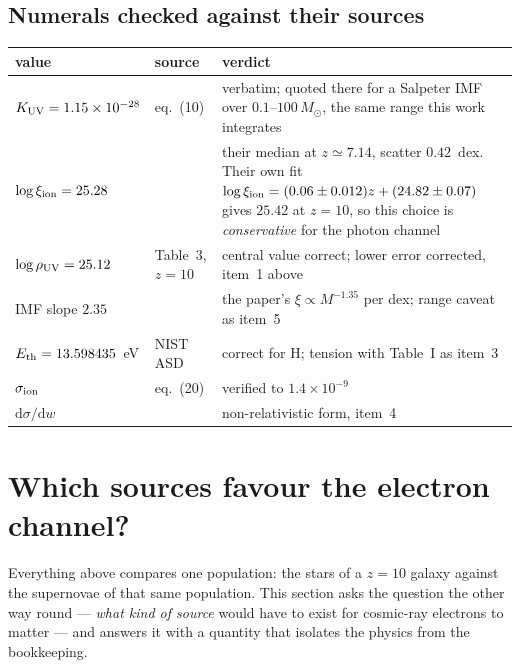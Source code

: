\documentclass[11pt,a4paper]{article}
\begin{document}
\subsection{Numerals checked against their sources}
\begin{center}\small
\begin{tabular}{llp{6.1cm}}
\hline
value & source & verdict \\
\hline
$K_{\rm UV}=1.15\times10^{-28}$ & \cite{md14} eq.~(10) & verbatim; quoted there for a
  Salpeter IMF over $0.1$--$100\,M_\odot$, the same range this work integrates \\
$\log\xi_{\rm ion}=25.28$ & \cite{llerena25} & their median at $z\simeq7.14$,
  scatter $0.42$~dex. Their own fit
  $\log\xi_{\rm ion}=(0.06\pm0.012)z+(24.82\pm0.07)$ gives $25.42$ at $z=10$, so
  this choice is \emph{conservative} for the photon channel \\
$\log\rho_{\rm UV}=25.12$ & \cite{donnan24} Table~3, $z=10$ & central value
  correct; lower error corrected, item~1 above \\
IMF slope $2.35$ & \cite{salpeter} & the paper's $\xi\propto M^{-1.35}$ per dex;
  range caveat as item~5 \\
$E_{\rm th}=13.598435$~eV & NIST ASD & correct for H; tension with
  \cite{kimrudd94} Table~I as item~3 \\
$\sigma_{\rm ion}$ & \cite{kim00} eq.~(20) & verified to $1.4\times10^{-9}$ \\
$\mathrm{d}\sigma/\mathrm{d}w$ & \cite{kimrudd94} & non-relativistic form, item~4 \\
\hline
\end{tabular}
\end{center}

\clearpage
\section{Which sources favour the electron channel?}\label{sec:sources}

Everything above compares one population: the stars of a $z=10$ galaxy against the
supernovae of that same population. This section asks the question the other way
round --- \emph{what kind of source} would have to exist for cosmic-ray electrons
to matter --- and answers it with a quantity that isolates the physics from the
bookkeeping.
\end{document}
